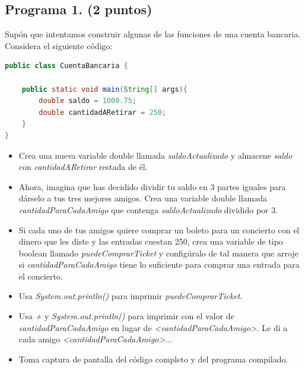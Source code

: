 \documentclass{article}
\begin{document}
\subsection*{Programa 1. (2 puntos)}
Supón que intentamos construir algunas de las funciones de una cuenta bancaria. Considera el siguiente código:

\begin{lstlisting}[language=Java, caption={Código base del programa CuentaBancaria.java}]
public class CuentaBancaria {

    public static void main(String[] args){
        double saldo = 1000.75;
        double cantidadARetirar = 250;
    }
}
\end{lstlisting}

\begin{itemize}
    \item Crea una nueva variable double llamada \textit{saldoActualizado} y almacene \textit{saldo} con \textit{cantidadARetirar} restada de él.
    \item Ahora, imagina que has decidido dividir tu saldo en 3 partes iguales para dárselo a tus tres mejores amigos. Crea una variable double llamada \textit{cantidadParaCadaAmigo} que contenga \textit{saldoActualizado} dividido por 3.
    \item Si cada uno de tus amigos quiere comprar un boleto para un concierto con el dinero que les diste y las entradas cuestan 250, crea una variable de tipo boolean llamado \textit{puedeComprarTicket} y configúralo de tal manera que arroje si \textit{cantidadParaCadaAmigo} tiene lo suficiente para comprar una entrada para el concierto.
    \item Usa \textit{System.out.println()} para imprimir \textit{puedeComprarTicket}.
    \item Usa \textit{+} y \textit{System.out.println()} para imprimir con el valor de \textit{cantidadParaCadaAmigo} en lugar de \textit{<cantidadParaCadaAmigo>}. Le di a cada amigo \textit{<cantidadParaCadaAmigo>}...
    \item Toma captura de pantalla del código completo y del programa compilado.
\end{itemize}
\end{document}
